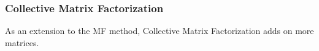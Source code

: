 \subsubsection{Collective Matrix Factorization}
As an extension to the MF method, Collective Matrix Factorization adds on more matrices.
